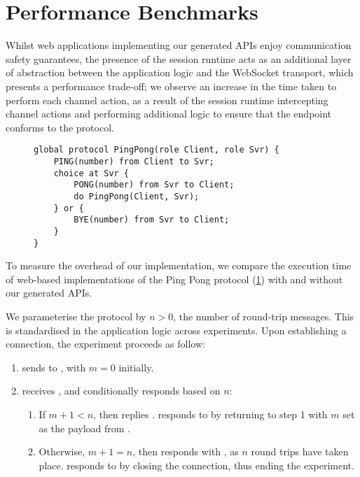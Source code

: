 \section{Performance Benchmarks}
\label{section:benchmarks}

Whilst web applications implementing 
our generated APIs enjoy
communication safety guarantees, 
the presence of the session runtime acts
as an additional layer of abstraction between 
the application logic and the
WebSocket transport, which presents
a performance trade-off; we observe an
increase in the time taken to perform
each channel action, as a result of
the session runtime intercepting channel actions
and performing additional logic to ensure
that the endpoint conforms to the protocol.

\begin{figure}[!ht]
\begin{lstlisting}[language=Scribble]
global protocol PingPong(role Client, role Svr) {
	PING(number) from Client to Svr;
	choice at Svr {
		PONG(number) from Svr to Client;
		do PingPong(Client, Svr);
	} or {
		BYE(number) from Svr to Client;	
	}
}
\end{lstlisting}
\label{lst:pingpong}
\end{figure}

To measure the overhead of our implementation, we compare the
execution time of web-based implementations of the
Ping Pong protocol (\cref{lst:pingpong}) with and without
our generated APIs.

We parameterise the  protocol by $n > 0$, the number of
round-trip messages. This is standardised in the application logic
across experiments.
Upon establishing a connection, the experiment proceeds as follow:

\begin{enumerate}

\item {} sends  to , 
with $m = 0$ initially.

\item {} receives , and
conditionally responds based on $n$:

\begin{enumerate}
\item If $m + 1 < n$, then  replies .
 responds to  by returning to
step 1 with $m$ set as the payload from .

\item Otherwise, $m + 1 = n$, then  responds with 
, as $n$ round trips have taken place. 
 responds to  by 
closing the connection, thus ending the experiment.
\end{enumerate}

\end{enumerate}

